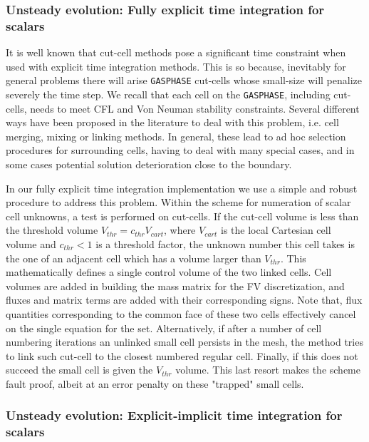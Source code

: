\documentclass[12pt]{article}
\begin{document}
\subsubsection{Unsteady evolution: Fully explicit time integration for scalars} \label{sec:exscl}

It is well known that cut-cell methods pose a significant time constraint when used with explicit time integration methods.
This is so because, inevitably for general problems there will arise \texttt{GASPHASE} cut-cells whose small-size will penalize
severely the time step. We recall that each cell on the \texttt{GASPHASE}, including cut-cells, needs to meet CFL and Von Neuman stability constraints. Several different ways have been proposed in the literature to deal with this problem, i.e. cell merging, mixing or linking methods. In general, these lead to ad hoc selection procedures for surrounding cells, having to deal with many special cases, and in some cases potential solution deterioration close to the boundary.

In our fully explicit time integration implementation we use a simple and robust procedure to address this problem. Within the scheme for numeration of scalar cell unknowns, a test is performed on cut-cells. If the cut-cell volume is less than the threshold volume $V_{thr}= c_{thr} V_{cart}$, where $V_{cart}$ is the local Cartesian cell volume and $c_{thr}<1$ is a threshold factor, the unknown number this cell takes is the one of an adjacent cell which has a volume larger than $V_{thr}$. This mathematically defines a single control volume of the two linked cells. Cell volumes are added in building the mass matrix for the FV discretization, and fluxes and matrix terms are added with their corresponding signs. Note that, flux quantities corresponding to the common face of these two cells effectively cancel on the single equation for the set.
Alternatively, if after a number of cell numbering iterations an unlinked small cell persists in the mesh, the method tries to link such cut-cell to the closest numbered regular cell. Finally, if this does not succeed the small cell is given the $V_{thr}$ volume. This last resort makes the scheme fault proof, albeit at an error penalty on these "trapped" small cells.



\subsubsection{Unsteady evolution: Explicit-implicit time integration for scalars} \label{sec:eximscl}
\end{document}
